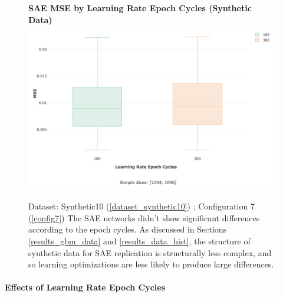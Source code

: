 \documentclass[a4paper,11pt,oneside]{article}
\theoremstyle{plain}
\theoremstyle{definition}
\begin{document}
		\begin{figure}[H]
		\centering 
		\textbf{SAE MSE by Learning Rate Epoch Cycles (Synthetic Data)}
		\includegraphics[scale=0.3]{images/results/network/lr/synth_mse_lr_epochs.png} 
		\caption[SAE MSE by Learning Rate Epoch Cycles (Synthetic Data)]{Dataset: Synthetic10 (\ref{dataset_synthetic10}) ; Configuration 7 (\ref{config7})
			\newline The SAE networks didn't show significant differences according to the epoch cycles. As discussed in Sections \ref{results_gbm_data} and \ref{results_data_hist}, the structure of synthetic data for SAE replication is structurally less complex, and so learning optimizations are less likely to produce large differences.}
		\label{figure-synth_mse_lr_epochs}
		\end{figure}
	
		\paragraph{Effects of Learning Rate Epoch Cycles}
	
\end{document}

